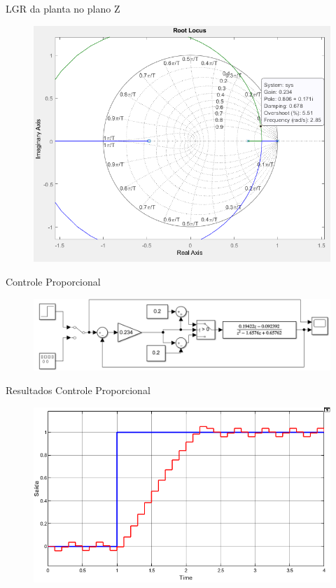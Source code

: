 \documentclass{beamer}
\begin{document}
\begin{frame}{LGR da planta no plano Z}
\begin{figure}
    \centering
    \includegraphics[width = 0.8 \linewidth]{src/tex/img/rlocus.PNG}
    \caption{}
    \label{fig:control_1}
\end{figure}
\end{frame}

\begin{frame}{Controle Proporcional}
\begin{figure}
    \centering
    \includegraphics[width = \linewidth]{src/tex/img/controle_1.PNG}
    \caption{}
    \label{fig:control_1}
\end{figure}
\end{frame}




\begin{frame}{Resultados Controle Proporcional}
\begin{figure}
    \centering
    \includegraphics[width = \linewidth]{src/tex/img/saida_controle_1.png}
    \caption{}
    \label{fig:control_1}
\end{figure}
\end{frame}
\end{document}
